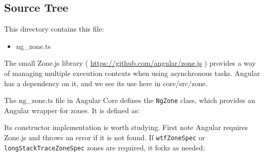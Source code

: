 \subsection{Source Tree}

This directory contains this file:

\begin{itemize}
  \item ng\_zone.ts
\end{itemize}

The small Zone.js library (
\url{https://github.com/angular/zone.js}
) provides a way of
managing multiple execution contexts when using asynchronous tasks. Angular has a
dependency on it, and we see its use here in core/src/zone.

The ng\_zone.ts file in Angular Core defines the
\texttt{NgZone}
class, which provides an
Angular wrapper for zones. It is defined as:



Its constructor implementation is worth studying. First note Angular requires Zone.js
and throws an error if it is not found. If
\texttt{wtfZoneSpec}
or
\texttt{longStackTraceZoneSpec}
zones are required, it forks as needed:



